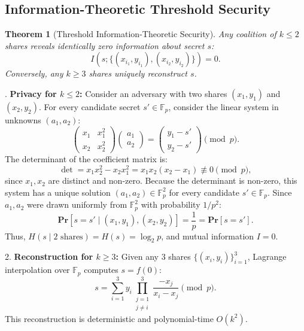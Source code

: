 \documentclass{ieeeaccess}
\renewcommand{\Pr}{\mathbf{Pr}}
\newcommand{\F}{\mathbb{F}}
\newtheorem{theorem}{Theorem}
\newenvironment{proof}{\begin{IEEEproof}\IEEEQEDoff}{\end{IEEEproof}}
\begin{document}
\subsection{Information-Theoretic Threshold Security}
\begin{theorem}[Threshold Information-Theoretic Security]
\label{thm:L9-shamir}
Any coalition of $k \leq 2$ shares reveals identically zero information about secret $s$:
\begin{equation}
  I(s; \{(x_{i_1}, y_{i_1}), (x_{i_2}, y_{i_2})\}) = 0.
\end{equation}
Conversely, any $k \geq 3$ shares uniquely reconstruct $s$.
\end{theorem}
\begin{proof}
1. \textbf{Privacy for $k \leq 2$:}
Consider an adversary with two shares $(x_1, y_1)$ and $(x_2, y_2)$.
For every candidate secret $s' \in \F_p$, consider the linear system in unknowns $(a_1, a_2)$:
\begin{equation}
\begin{pmatrix}
  x_1 & x_1^2 \\
  x_2 & x_2^2
\end{pmatrix}
\begin{pmatrix}
  a_1 \\ a_2
\end{pmatrix}
=
\begin{pmatrix}
  y_1 - s' \\
  y_2 - s'
\end{pmatrix}
\pmod p.
\end{equation}
The determinant of the coefficient matrix is:
\begin{equation}
  \det = x_1 x_2^2 - x_2 x_1^2 = x_1 x_2 (x_2 - x_1) \not\equiv 0 \pmod p,
\end{equation}
since $x_1, x_2$ are distinct and non-zero.
Because the determinant is non-zero, this system has a unique solution $(a_1, a_2) \in \F_p^2$ for every candidate $s' \in \F_p$.
Since $a_1, a_2$ were drawn uniformly from $\F_p^2$ with probability $1/p^2$:
\begin{equation}
  \Pr[s = s' \mid (x_1, y_1), (x_2, y_2)] = \frac{1}{p} = \Pr[s = s'].
\end{equation}
Thus, $H(s \mid \text{2 shares}) = H(s) = \log_2 p$, and mutual information $I = 0$.

2. \textbf{Reconstruction for $k \geq 3$:}
Given any 3 shares $\{(x_i, y_i)\}_{i=1}^3$, Lagrange interpolation over $\F_p$ computes $s = f(0)$:
\begin{equation}
  s = \sum_{i=1}^3 y_i \prod_{\substack{j=1 \\ j \neq i}}^3 \frac{-x_j}{x_i - x_j} \pmod p.
\end{equation}
This reconstruction is deterministic and polynomial-time $O(k^2)$.
\end{proof}
\end{document}
